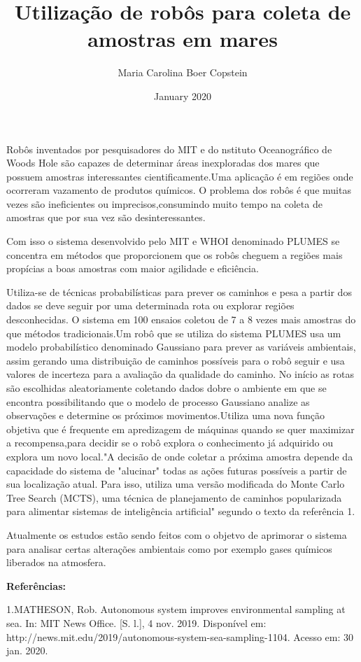 \documentclass{article}
\title{Utilização de robôs para coleta de amostras em  mares}
\author{Maria Carolina Boer Copstein }
\date{January 2020}
\begin{document}
\maketitle
\hfill 

Robôs inventados por pesquisadores do MIT e do nstituto Oceanográfico de Woods Hole são capazes de determinar áreas inexploradas dos mares que possuem amostras interessantes cientificamente.Uma aplicação é em regiões onde ocorreram vazamento de produtos químicos.
O problema dos robôs é que muitas vezes são ineficientes ou imprecisos,consumindo muito tempo na coleta de amostras que por sua vez são desinteressantes.
\hfill

Com isso o sistema desenvolvido pelo MIT e WHOI denominado PLUMES se concentra  em métodos  que proporcionem que os robôs cheguem a regiões mais propícias a boas amostras com maior agilidade e eficiência.
\hfill

 Utiliza-se de  técnicas probabilísticas para prever os caminhos e pesa a partir dos dados se deve seguir por uma determinada rota ou explorar regiões desconhecidas. O sistema em 100 ensaios coletou de 7 a 8 vezes mais amostras do que métodos tradicionais.Um robô que se utiliza do sistema PLUMES usa um modelo probabilístico denominado Gaussiano para prever as variáveis ambientais, assim gerando uma distribuição de caminhos possíveis para o robô seguir e usa valores de incerteza para a avaliação da qualidade do caminho. No início as rotas são escolhidas aleatoriamente coletando dados dobre o ambiente em que se encontra possibilitando que o modelo de processo Gaussiano analize as observações e determine os próximos movimentos.Utiliza uma nova função objetiva que é frequente em apredizagem de máquinas quando se quer maximizar a recompensa,para decidir se o robô explora o conhecimento já adquirido ou explora um novo local."A decisão de onde coletar a próxima amostra depende da capacidade do sistema de "alucinar" todas as ações futuras possíveis a partir de sua localização atual. Para isso, utiliza uma versão modificada do Monte Carlo Tree Search (MCTS), uma técnica de planejamento de caminhos popularizada para alimentar sistemas de inteligência artificial" segundo o texto da referência 1.
\hfill

Atualmente os estudos estão sendo feitos com o objetvo de aprimorar o sistema para analisar certas alterações ambientais como por exemplo gases químicos liberados na atmosfera.

\hfill

\textbf{Referências:} \

\hfill 

1.MATHESON, Rob. Autonomous system improves environmental sampling at sea. In: MIT News Office. [S. l.], 4 nov. 2019. Disponível em: http://news.mit.edu/2019/autonomous-system-sea-sampling-1104. Acesso em: 30 jan. 2020.
\end{document}
